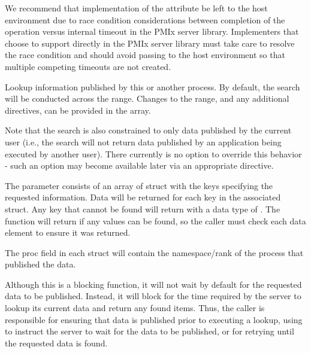 \optattrend

\adviceimplstart
We recommend that implementation of the  attribute be left to the host environment due to race condition considerations between completion of the operation versus internal timeout in the \ac{PMIx} server library. Implementers that choose to support  directly in the \ac{PMIx} server library must take care to resolve the race condition and should avoid passing  to the host environment so that multiple competing timeouts are not created.
\adviceimplend

\descr

Lookup information published by this or another process.
By default, the search will be conducted across the  range.
Changes to the range, and any additional directives, can be provided in the  array.

Note that the search is also constrained to only data published by the current user (i.e., the search will not return data published by an application being executed by another user).
There currently is no option to override this behavior - such an option may become available later via an appropriate  directive.

The  parameter consists of an array of  struct with the keys specifying the requested information.
Data will be returned for each key in the associated  struct.
Any key that cannot be found will return with a data type of .
The function will return  if any values can be found, so the caller must check each data element to ensure it was returned.

The proc field in each  struct will contain the namespace/rank of the process that published the data.

\adviceuserstart
Although this is a blocking function, it will not wait by default for the requested data to be published.
Instead, it will block for the time required by the server to lookup its current data and return any found items.
Thus, the caller is responsible for ensuring that data is published prior to executing a lookup, using  to instruct the server to wait for the data to be published, or for retrying until the requested data is found.
\adviceuserend

\subsection{}

